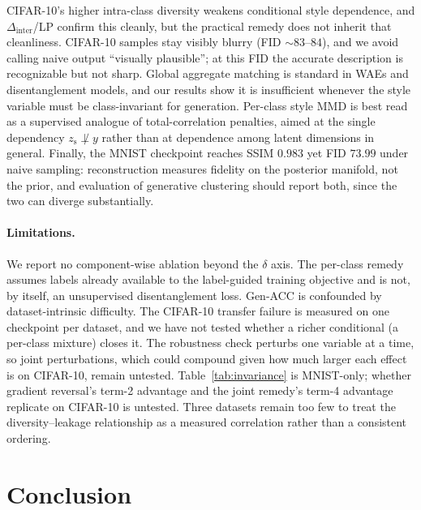 \documentclass[letterpaper]{article}
\newcommand{\zs}{z_{\mathrm{s}}}
\newcommand{\Dinter}{\Delta_{\mathrm{inter}}}
\begin{document}
CIFAR-10's higher intra-class diversity weakens conditional style dependence,
and $\Dinter$/LP confirm this cleanly, but the practical remedy does not
inherit that cleanliness. CIFAR-10 samples stay visibly blurry (FID
$\sim83$--$84$), and we avoid calling naive output ``visually plausible''; at
this FID the accurate description is recognizable but not sharp. Global
aggregate matching is standard in WAEs and disentanglement models, and our
results show it is insufficient whenever the style variable must be
class-invariant for generation. Per-class style MMD is best read as a
supervised analogue of total-correlation penalties, aimed at the single
dependency $\zs\not\perp y$ rather than at dependence among latent dimensions
in general. Finally, the MNIST checkpoint reaches SSIM $0.983$ yet FID
$73.99$ under naive sampling: reconstruction measures fidelity on the
posterior manifold, not the prior, and evaluation of generative clustering
should report both, since the two can diverge substantially.

\paragraph{Limitations.}
We report no component-wise ablation beyond the $\delta$ axis. The per-class remedy
assumes labels already available to the label-guided training objective and
is not, by itself, an unsupervised disentanglement loss. Gen-ACC is
confounded by dataset-intrinsic difficulty. The CIFAR-10 transfer failure is
measured on one checkpoint per dataset, and we have not tested whether a
richer conditional (a per-class mixture) closes it. The robustness check
perturbs one variable at a time, so joint perturbations, which could compound
given how much larger each effect is on CIFAR-10, remain untested.
{Table~\ref{tab:invariance} is MNIST-only; whether gradient reversal's
term-2 advantage and the joint remedy's term-4 advantage replicate on
CIFAR-10 is untested. Three datasets remain too few to treat the
diversity--leakage relationship as a measured correlation rather than a
consistent ordering.}

\section{Conclusion}
\end{document}
